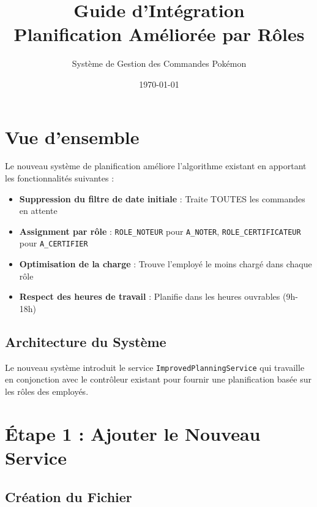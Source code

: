 \documentclass[11pt,a4paper]{article}
\title{\textbf{\Huge Guide d'Intégration} \\ \vspace{0.5cm} \LARGE Planification Améliorée par Rôles}
\author{Système de Gestion des Commandes Pokémon}
\date{\today}
\begin{document}
    \maketitle
    \tableofcontents
    \newpage

    \section{Vue d'ensemble}

    Le nouveau système de planification améliore l'algorithme existant en apportant les fonctionnalités suivantes :

    \begin{tcolorbox}[colback=successbox,colframe=green!50!black,title=\textbf{Améliorations Principales}]
        \begin{itemize}[leftmargin=*]
            \item \textbf{Suppression du filtre de date initiale} : Traite TOUTES les commandes en attente
            \item \textbf{Assignment par rôle} : \texttt{ROLE\_NOTEUR} pour \texttt{A\_NOTER}, \texttt{ROLE\_CERTIFICATEUR} pour \texttt{A\_CERTIFIER}
            \item \textbf{Optimisation de la charge} : Trouve l'employé le moins chargé dans chaque rôle
            \item \textbf{Respect des heures de travail} : Planifie dans les heures ouvrables (9h-18h)
        \end{itemize}
    \end{tcolorbox}

    \subsection{Architecture du Système}

    Le nouveau système introduit le service \texttt{ImprovedPlanningService} qui travaille en conjonction avec le contrôleur existant pour fournir une planification basée sur les rôles des employés.

    \section{Étape 1 : Ajouter le Nouveau Service}

    \subsection{Création du Fichier}
\end{document}
